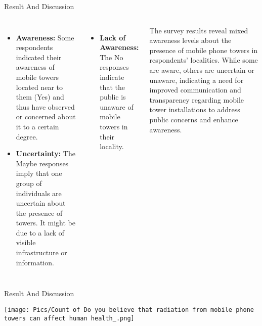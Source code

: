 \documentclass[7pt, aspectratio=169]{beamer}
\begin{document}
\begin{frame}{Result And Discussion}
\begin{columns}
    \begin{itemize}
        \item \textbf{Awareness:} Some respondents indicated their awareness of mobile towers located near to them (Yes) and thus have observed or concerned about it to a certain degree.
        \item \textbf{Uncertainty:} The Maybe responses imply that one group of individuals are uncertain about the presence of towers. It might be due to a lack of visible infrastructure or information.
    \end{itemize}

    
    \begin{itemize}
        \item \textbf{Lack of Awareness:} The No responses indicate that the public is unaware of mobile towers in their locality.
    \end{itemize}
    The survey results reveal mixed awareness levels about the presence of mobile phone towers in respondents' localities. While some are aware, others are uncertain or unaware, indicating a need for improved communication and transparency regarding mobile tower installations to address public concerns and enhance awareness.
\end{columns}
    
\end{frame}

\begin{frame}{Result And Discussion}
\begin{center}
    \texttt{[image: Pics/Count of Do you believe that radiation from mobile phone towers can affect human health\_.png]}
\end{center}
\end{frame}
\end{document}
